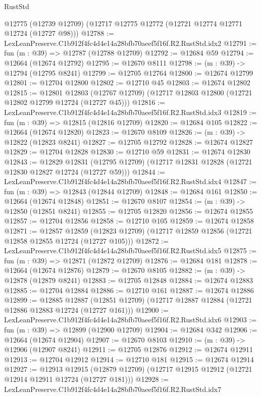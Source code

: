 \begin{lexlean}{RustStd}
\begin{coremodule}
    @12775
    (@12739 @12709)
    (@12717 @12775 @12772 (@12721 @12774 @12771 @12724 (@12727 @98)))
@12788 := LexLeanPreserve.C1b912f4fc4d4e14a28bfb70aeef5f16f.R2.RustStd.idx2
@12791 := fun (m : @39) => @12787 (@12788 @12709)
@12792 := @12684 @59
@12794 := @12664 (@12674 @12792)
@12795 := @12670 @8111
@12798 := (m : @39) -> @12794 (@12795 @8241)
@12799 := @12705 @12764
@12800 := @12674 @12799
@12801 := @12704 @12800
@12802 := @12710 @45
@12803 := @12674 @12802
@12815 := @12801
    @12803
    (@12767 @12709)
    (@12717 @12803 @12800 (@12721 @12802 @12799 @12724 (@12727 @45)))
@12816 := LexLeanPreserve.C1b912f4fc4d4e14a28bfb70aeef5f16f.R2.RustStd.idx3
@12819 := fun (m : @39) => @12815 (@12816 @12709)
@12820 := @12684 @105
@12822 := @12664 (@12674 @12820)
@12823 := @12670 @8109
@12826 := (m : @39) -> @12822 (@12823 @8241)
@12827 := @12705 @12792
@12828 := @12674 @12827
@12829 := @12704 @12828
@12830 := @12710 @59
@12831 := @12674 @12830
@12843 := @12829
    @12831
    (@12795 @12709)
    (@12717 @12831 @12828 (@12721 @12830 @12827 @12724 (@12727 @59)))
@12844 := LexLeanPreserve.C1b912f4fc4d4e14a28bfb70aeef5f16f.R2.RustStd.idx4
@12847 := fun (m : @39) => @12843 (@12844 @12709)
@12848 := @12684 @161
@12850 := @12664 (@12674 @12848)
@12851 := @12670 @8107
@12854 := (m : @39) -> @12850 (@12851 @8241)
@12855 := @12705 @12820
@12856 := @12674 @12855
@12857 := @12704 @12856
@12858 := @12710 @105
@12859 := @12674 @12858
@12871 := @12857
    @12859
    (@12823 @12709)
    (@12717 @12859 @12856 (@12721 @12858 @12855 @12724 (@12727 @105)))
@12872 := LexLeanPreserve.C1b912f4fc4d4e14a28bfb70aeef5f16f.R2.RustStd.idx5
@12875 := fun (m : @39) => @12871 (@12872 @12709)
@12876 := @12684 @181
@12878 := @12664 (@12674 @12876)
@12879 := @12670 @8105
@12882 := (m : @39) -> @12878 (@12879 @8241)
@12883 := @12705 @12848
@12884 := @12674 @12883
@12885 := @12704 @12884
@12886 := @12710 @161
@12887 := @12674 @12886
@12899 := @12885
    @12887
    (@12851 @12709)
    (@12717 @12887 @12884 (@12721 @12886 @12883 @12724 (@12727 @161)))
@12900 := LexLeanPreserve.C1b912f4fc4d4e14a28bfb70aeef5f16f.R2.RustStd.idx6
@12903 := fun (m : @39) => @12899 (@12900 @12709)
@12904 := @12684 @342
@12906 := @12664 (@12674 @12904)
@12907 := @12670 @8103
@12910 := (m : @39) -> @12906 (@12907 @8241)
@12911 := @12705 @12876
@12912 := @12674 @12911
@12913 := @12704 @12912
@12914 := @12710 @181
@12915 := @12674 @12914
@12927 := @12913
    @12915
    (@12879 @12709)
    (@12717 @12915 @12912 (@12721 @12914 @12911 @12724 (@12727 @181)))
@12928 := LexLeanPreserve.C1b912f4fc4d4e14a28bfb70aeef5f16f.R2.RustStd.idx7

\end{coremodule}
\end{lexlean}
